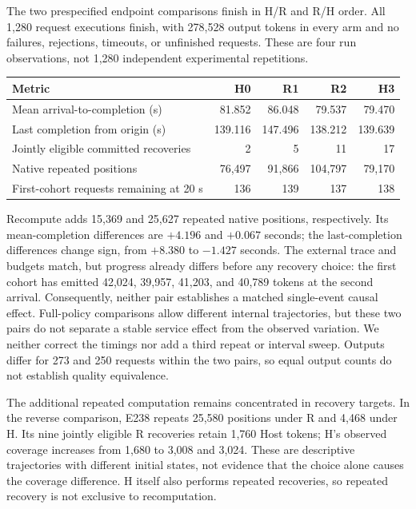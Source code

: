 \documentclass[10pt,a4paper]{article}
\begin{document}
The two prespecified endpoint comparisons finish in H/R and R/H order. All
1,280 request executions finish, with 278,528 output tokens in every arm and
no failures, rejections, timeouts, or unfinished requests. These are four run
observations, not 1,280 independent experimental repetitions.
\begin{center}
\begin{tabular}{lrrrr}
\toprule
Metric & H0 & R1 & R2 & H3\\
\midrule
Mean arrival-to-completion (s) & 81.852 & 86.048 & 79.537 & 79.470\\
Last completion from origin (s) & 139.116 & 147.496 & 138.212 & 139.639\\
Jointly eligible committed recoveries & 2 & 5 & 11 & 17\\
Native repeated positions & 76,497 & 91,866 & 104,797 & 79,170\\
First-cohort requests remaining at 20 s & 136 & 139 & 137 & 138\\
\bottomrule
\end{tabular}
\end{center}
Recompute adds 15,369 and 25,627 repeated native positions, respectively.
Its mean-completion differences are $+4.196$ and $+0.067$ seconds; the
last-completion differences change sign, from $+8.380$ to $-1.427$ seconds.
The external trace and budgets match, but progress already differs before any
recovery choice: the first cohort has emitted 42,024, 39,957, 41,203, and
40,789 tokens at the second arrival. Consequently, neither pair establishes
a matched single-event causal effect. Full-policy comparisons allow different
internal trajectories, but these two pairs do not separate a stable service
effect from the observed variation. We neither correct the timings nor add a
third repeat or interval sweep. Outputs differ for 273 and 250 requests within
the two pairs, so equal output counts do not establish quality equivalence.

The additional repeated computation remains concentrated in recovery targets.
In the reverse comparison, E238 repeats 25,580 positions under R and 4,468
under H. Its nine jointly eligible R recoveries retain 1,760 Host tokens;
H's observed coverage increases from 1,680 to 3,008 and 3,024. These are
descriptive trajectories with different initial states, not evidence that the
choice alone causes the coverage difference. H itself also performs repeated
recoveries, so repeated recovery is not exclusive to recomputation.
\end{document}
